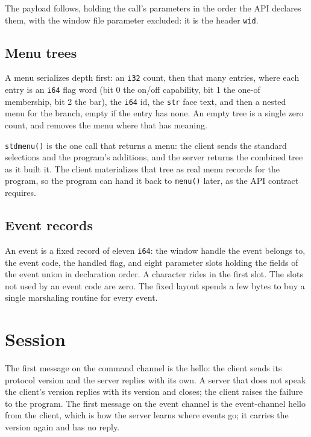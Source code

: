 \documentclass[11pt]{article}
\begin{document}
The payload follows, holding the call's parameters in the order the API
declares them, with the window file parameter excluded: it is the header
\texttt{wid}.

\subsection{Menu trees}

A menu serializes depth first: an \texttt{i32} count, then that many
entries, where each entry is an \texttt{i64} flag word (bit 0 the on/off
capability, bit 1 the one-of membership, bit 2 the bar), the \texttt{i64}
id, the \texttt{str} face text, and then a nested menu for the branch,
empty if the entry has none. An empty tree is a single zero count, and
removes the menu where that has meaning.

\texttt{stdmenu()} is the one call that returns a menu: the client sends
the standard selections and the program's additions, and the server
returns the combined tree as it built it. The client materializes that
tree as real menu records for the program, so the program can hand it back
to \texttt{menu()} later, as the API contract requires.

\subsection{Event records}

An event is a fixed record of eleven \texttt{i64}: the window handle the
event belongs to, the event code, the handled flag, and eight parameter
slots holding the fields of the event union in declaration order. A
character rides in the first slot. The slots not used by an event code are
zero. The fixed layout spends a few bytes to buy a single marshaling
routine for every event.

\section{Session}

The first message on the command channel is the hello: the client sends its
protocol version and the server replies with its own. A server that does
not speak the client's version replies with its version and closes; the
client raises the failure to the program. The first message on the event
channel is the event-channel hello from the client, which is how the
server learns where events go; it carries the version again and has no
reply.
\end{document}
